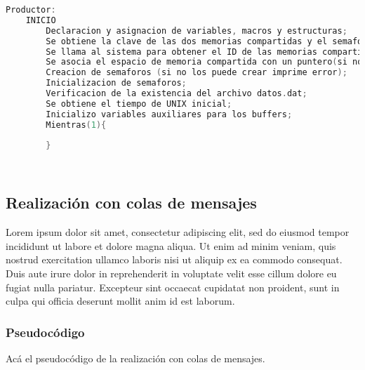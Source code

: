 \begin{lstlisting}[language=C]          % No usar tildes en el pseudocódigo
    Productor:
    INICIO
        Declaracion y asignacion de variables, macros y estructuras;
        Se obtiene la clave de las dos memorias compartidas y el semaforo (en el caso de que no las obtenga imprime error);
        Se llama al sistema para obtener el ID de las memorias compartidas (en el caso de que no las obtenga imprime error);
        Se asocia el espacio de memoria compartida con un puntero(si no puede asociar imprime error);
        Creacion de semaforos (si no los puede crear imprime error);
        Inicializacion de semaforos;
        Verificacion de la existencia del archivo datos.dat;
        Se obtiene el tiempo de UNIX inicial;
        Inicializo variables auxiliares para los buffers;
        Mientras(1){
        
        }
    
    
\end{lstlisting}

\subsection{Realización con colas de mensajes}

Lorem ipsum dolor sit amet, consectetur adipiscing elit, sed do eiusmod tempor incididunt ut labore et dolore magna aliqua. Ut enim ad minim veniam, quis nostrud exercitation ullamco laboris nisi ut aliquip ex ea commodo consequat. Duis aute irure dolor in reprehenderit in voluptate velit esse cillum dolore eu fugiat nulla pariatur. Excepteur sint occaecat cupidatat non proident, sunt in culpa qui officia deserunt mollit anim id est laborum.

\subsubsection{Pseudocódigo}

Acá el pseudocódigo de la realización con colas de mensajes.



